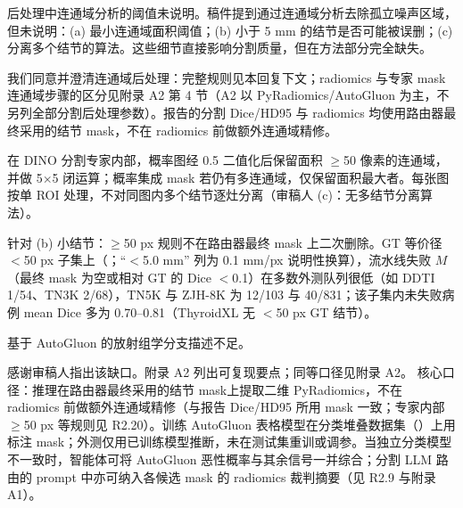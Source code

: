 \begin{reviewercomment}
后处理中连通域分析的阈值未说明。稿件提到通过连通域分析去除孤立噪声区域，但未说明：(a) 最小连通域面积阈值；(b) 小于 5 mm 的结节是否可能被误删；(c) 分离多个结节的算法。这些细节直接影响分割质量，但在方法部分完全缺失。
\end{reviewercomment}
\begin{authorresponse}
我们同意并澄清连通域后处理：完整规则见本回复下文；radiomics 与专家 mask 连通域步骤的区分见附录 A2 第 4 节（A2 以 PyRadiomics/AutoGluon 为主，不另列全部分割后处理参数）。报告的分割 Dice/HD95 与 radiomics 均使用路由器最终采用的结节 mask，不在 radiomics 前做额外连通域精修。\par
在 DINO 分割专家内部，概率图经 0.5 二值化后保留面积 $\geq$50 像素的连通域，并做 5$\times$5 闭运算；概率集成 mask 若仍有多连通域，仅保留面积最大者。每张图按单 ROI 处理，不对同图内多个结节逐灶分离（审稿人 (c)：无多结节分离算法）。\par
针对 (b) 小结节：$\geq$50 px 规则不在路由器最终 mask 上二次删除。GT 等价径 $<$50 px 子集上（；``$<$5.0 mm'' 列为 0.1 mm/px 说明性换算），流水线失败 $M$（最终 mask 为空或相对 GT 的 Dice $<$0.1）在多数外测队列很低（如 DDTI 1/54、TN3K 2/68），TN5K 与 ZJH-8K 为 12/103 与 40/831；该子集内未失败病例 mean Dice 多为 0.70--0.81（ThyroidXL 无 $<$50 px GT 结节）。\par
\par
\end{authorresponse}

\begin{reviewercomment}
基于 AutoGluon 的放射组学分支描述不足。
\end{reviewercomment}
\begin{authorresponse}
感谢审稿人指出该缺口。附录 A2 列出可复现要点；同等口径见附录 A2。 核心口径：推理在路由器最终采用的结节 mask上提取二维 PyRadiomics，不在 radiomics 前做额外连通域精修（与报告 Dice/HD95 所用 mask 一致；专家内部 $\geq$50 px 等规则见 R2.20）。训练 AutoGluon 表格模型在分类堆叠数据集（）上用标注 mask；外测仅用已训练模型推断，未在测试集重训或调参。当独立分类模型不一致时，智能体可将 AutoGluon 恶性概率与其余信号一并综合；分割 LLM 路由的 prompt 中亦可纳入各候选 mask 的 radiomics 裁判摘要（见 R2.9 与附录 A1）。\par
\par
\end{authorresponse}

